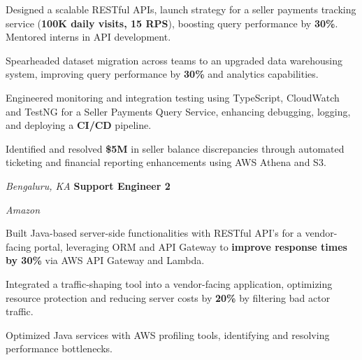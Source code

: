 \begin{onecolentry}
    \begin{highlights}
        \item Designed a scalable RESTful APIs, launch strategy for a seller payments tracking service (\textbf{100K daily visits, 15 RPS}), boosting query performance by \textbf{30\%}. Mentored interns in API development.
        \item Spearheaded dataset migration across teams to an upgraded data warehousing system, improving query performance by \textbf{30\%} and analytics capabilities.
        \item Engineered monitoring and integration testing using TypeScript, CloudWatch and TestNG for a Seller Payments Query Service, enhancing debugging, logging, and deploying a \textbf{CI/CD} pipeline.
        \item Identified and resolved \textbf{\$5M} in seller balance discrepancies through automated ticketing and financial reporting enhancements using AWS Athena and S3.
    \end{highlights}
\end{onecolentry}

\vspace{0.15 cm}

\begin{twocolentry}{
    \textit{Bengaluru, KA}}
    \textbf{Support Engineer 2}
    
    \textit{Amazon}
\end{twocolentry}

\vspace{0.15 cm}

\begin{onecolentry}
    \begin{highlights}
        \item Built Java-based server-side functionalities with RESTful API's for a vendor-facing portal, leveraging ORM and API Gateway to \textbf{improve response times by 30\%} via AWS API Gateway and Lambda.
        \item Integrated a traffic-shaping tool into a vendor-facing application, optimizing resource protection and reducing server costs by \textbf{20\%} by filtering bad actor traffic.
        \item Optimized Java services with AWS profiling tools, identifying and resolving performance bottlenecks.
    \end{highlights}
\end{onecolentry}
